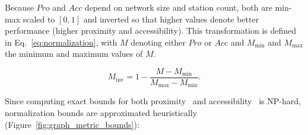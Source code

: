         Because $Pro$ and $Acc$ depend on network size and station count, both are min-max scaled to $[0,1]$ and inverted so that higher values denote better performance (higher proximity and accessibility). This transformation is defined in Eq.~\ref{eq:normalization}, with $M$ denoting either $Pro$ or $Acc$ and \(M_{\min}\) and \(M_{\max}\) the minimum and maximum values of $M$.

        \begin{equation} \label{eq:normalization}
                M_{\mathrm{inv}} = 1 - \frac{M - M_{\min}}{M_{\max}-M_{\min}}.
        \end{equation}

        Since computing exact bounds for both proximity~\cite{Hassin1997, Ravi1994} and accessibility~\cite{Kariv2006, Hakimi1965} is NP-hard, normalization bounds are approximated heuristically (Figure~\ref{fig:graph_metric_bounds}):

